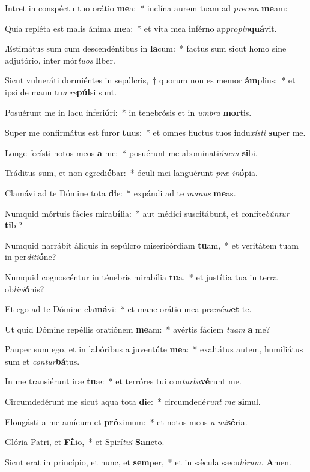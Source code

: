 \item Intret in conspéctu tuo orátio \textbf{me}a:~* inclína aurem tuam ad \textit{precem} \textbf{me}am:
\item Quia repléta est malis ánima \textbf{me}a:~* et vita mea inférno ap\textit{propin}\textbf{quá}vit.
\item Æstimátus sum cum descendéntibus in \textbf{la}cum:~* factus sum sicut homo sine adjutório, inter mór\textit{tuos} \textbf{li}ber.
\item Sicut vulneráti dormiéntes in sepúlcris,~† quorum non es memor \textbf{ám}plius:~* et ipsi de manu tu\hspace{0.03em}\textit{a} \textit{re}\textbf{púl}si sunt.
\item Posuérunt me in lacu inferi\textbf{ó}ri:~* in tenebrósis et in \textit{umbra} \textbf{mor}tis.
\item Super me confirmátus est furor \textbf{tu}us:~* et omnes fluctus tuos indu\hspace{0.03em}\textit{xísti} \textbf{su}per me.
\item Longe fecísti notos meos \textbf{a} me:~* posuérunt me abominati\hspace{0.03em}\textit{ónem} \textbf{si}bi.
\item Tráditus sum, et non egredi\textbf{é}bar:~* óculi mei languérunt \textit{præ} \textit{in}\textbf{ó}pia.
\item Clamávi ad te Dómine tota \textbf{di}e:~* expándi ad te \textit{manus} \textbf{me}as.
\item Numquid mórtuis fácies mira\textbf{bí}lia:~* aut médici suscitábunt, et confite\tinyhspace\textit{búntur} \textbf{ti}bi?
\item Numquid narrábit áliquis in sepúlcro misericórdiam \textbf{tu}am,~* et veritátem tuam in per\textit{diti}\textbf{ó}ne?
\item Numquid cognoscéntur in ténebris mirabília \textbf{tu}a,~* et justítia tua in terra ob\tinyhspace\textit{livi}\textbf{ó}nis?
\item Et ego ad te Dómine cla\textbf{má}vi:~* et mane orátio mea præ\textit{véni}\textbf{et} te.
\item Ut quid Dómine repéllis oratiónem \textbf{me}am:~* avértis fáciem \textit{tuam} \textbf{a} me?
\item Pauper sum ego, et in labóribus a juventúte \textbf{me}a:~* exaltátus autem, humiliátus sum et \textit{contur}\textbf{bá}tus.
\item In me transiérunt iræ \textbf{tu}æ:~* et terróres tui con\tinyhspace\textit{turba}\textbf{vé}runt me.
\item Circumdedérunt me sicut aqua tota \textbf{di}e:~* circumdedé\hspace{0.03em}\textit{runt} \textit{me} \textbf{si}mul.
\item Elongásti a me amícum et \textbf{pró}ximum:~* et notos meos \textit{a} \textit{mi}\textbf{sé}ria.
\item Glória Patri, et \textbf{Fí}lio,~* et Spirí\hspace{0.03em}\textit{tui} \textbf{San}cto.
\item Sicut erat in princípio, et nunc, et \textbf{sem}per,~* et in sǽcula sæcu\hspace{0.03em}\textit{lórum.} \textbf{A}men.

